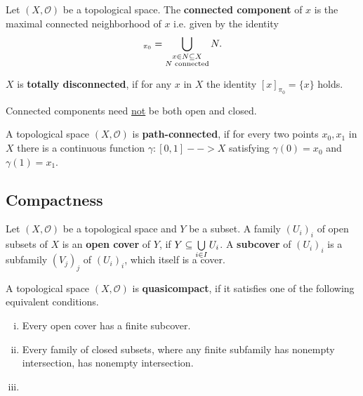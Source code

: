 \begin{lemma}
\end{lemma}

\begin{definition}
	Let $(X, \mathcal{O})$ be a topological space. The \textbf{connected component} of $x$ is the maximal connected neighborhood of $x$ i.e. given by the identity
	\begin{equation*}
		[x]_{\pi_0} = \Union \limits_{\substack{x \in N \subseteq X\\N\text{ connected}}} N.
	\end{equation*}

	$X$ is \textbf{totally disconnected}, if for any $x$ in $X$ the identity $[x]_{\pi_0} = \{x\}$ holds.
\end{definition}

\begin{remark}
	Connected components need \underline{not} be both open and closed. 
\end{remark}

\begin{lemma}
\end{lemma}

\begin{definition}
	A topological space $(X, \mathcal{O})$ is \textbf{path-connected}, if for every two points $x_0, x_1$ in $X$ there is a continuous function $\gamma: [0,1] --> X$ satisfying $\gamma(0) = x_0$ and $\gamma(1) = x_1$.
\end{definition}

\newpage
\subsection{Compactness}

\begin{definition}
	Let $(X,\mathcal{O})$ be a topological space and $Y$ be a subset. A family $(U_i)_i$ of open subsets of $X$ is an \textbf{open cover} of $Y$, if $Y \subseteq \smash{\bigcup \limits_{i \in I} U_i}$. A \textbf{subcover} of $(U_i)_i$ is a subfamily $(V_j)_j$ of $(U_i)_i$, which itself is a cover.
\end{definition}

\begin{definition}
	A topological space $(X,\mathcal{O})$ is \textbf{quasicompact}, if it satisfies one of the following equivalent conditions.
	\begin{enumerate}[(i)]
		\item{
			Every open cover has a finite subcover.
		}
		\item{
			Every family of closed subsets, where any finite subfamily has nonempty intersection, has nonempty intersection.
		}
		\item{
		}
	\end{enumerate}
\end{definition}

